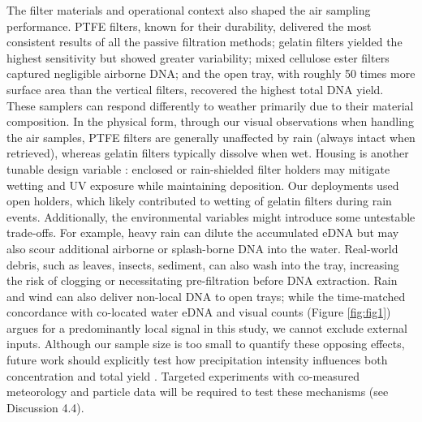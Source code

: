 \documentclass{article}
\begin{document}
The filter materials and operational context also shaped the air sampling performance. PTFE filters, known for their durability, delivered the most consistent results of all the passive filtration methods; gelatin filters yielded the highest sensitivity but showed greater variability; mixed cellulose ester filters captured negligible airborne DNA; and the open tray, with roughly 50 times more surface area than the vertical filters, recovered the highest total DNA yield. These samplers can respond differently to weather primarily due to their material composition. In the physical form, through our visual observations when handling the air samples, PTFE filters are generally unaffected by rain (always intact when retrieved), whereas gelatin filters typically dissolve when wet. Housing is another tunable design variable \cite{lynggaard2024}: enclosed or rain-shielded filter holders may mitigate wetting and UV exposure while maintaining deposition. Our deployments used open holders, which likely contributed to wetting of gelatin filters during rain events. Additionally, the environmental variables might introduce some untestable trade-offs. For example, heavy rain can dilute the accumulated eDNA but may also scour additional airborne or splash-borne DNA into the water. Real-world debris, such as leaves, insects, sediment, can also wash into the tray, increasing the risk of clogging or necessitating pre-filtration before DNA extraction. Rain and wind can also deliver non-local DNA to open trays; while the time-matched concordance with co-located water eDNA and visual counts (Figure \ref{fig:fig1}) argues for a predominantly local signal in this study, we cannot exclude external inputs. Although our sample size is too small to quantify these opposing effects, future work should explicitly test how precipitation intensity influences both concentration and total yield \cite{johnson2023}. Targeted experiments with co-measured meteorology and particle data will be required to test these mechanisms (see Discussion 4.4).
\end{document}
